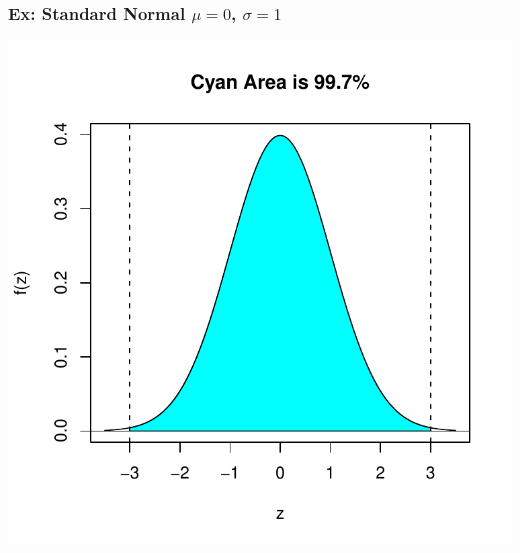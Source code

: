 \documentclass[slides]{beamer}
\begin{document}
\begin{frame}
\frametitle{Ex: Standard Normal $\mu=0$, $\sigma=1$}
\begin{center}
\includegraphics{figure/lec07-003}
\end{center}
\end{frame}
\end{document}
